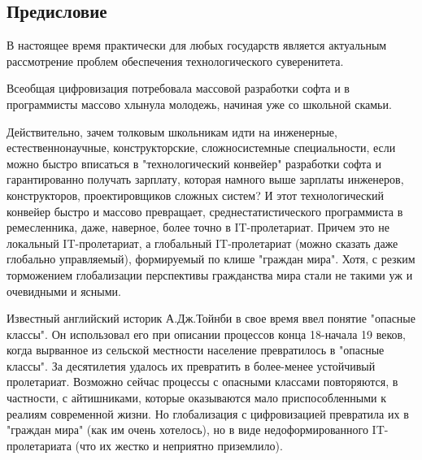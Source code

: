 \begin{partbacktext}
\part*{Предисловие}
\label{part_preface}

В настоящее время практически для любых государств является актуальным рассмотрение проблем обеспечения технологического суверенитета.

Всеобщая цифровизация потребовала массовой разработки софта и в программисты массово хлынула молодежь, начиная уже со школьной скамьи.

Действительно, зачем толковым школьникам идти на инженерные, естественнонаучные, конструкторские, сложносистемные специальности, если можно быстро вписаться в "технологический конвейер"{} разработки софта и гарантированно получать зарплату, которая намного выше зарплаты инженеров, конструкторов, проектировщиков сложных систем? И этот технологический конвейер быстро и массово превращает, среднестатистического программиста в ремесленника, даже, наверное, более точно в IT-пролетариат. Причем это не локальный IT-пролетариат, а глобальный IT-пролетариат (можно сказать даже глобально управляемый), формируемый по клише "граждан мира"{}. Хотя, с резким торможением глобализации перспективы гражданства мира стали не такими уж и очевидными и ясными.

Известный английский историк А.Дж.Тойнби в свое время ввел понятие "опасные классы"{}. Он использовал его при описании процессов конца 18-начала 19 веков, когда вырванное из сельской местности население превратилось в "опасные классы"{}. За десятилетия удалось их превратить в более-менее устойчивый пролетариат. Возможно сейчас процессы с опасными классами повторяются, в частности, с айтишниками, которые оказываются мало приспособленными к реалиям современной жизни. Но глобализация с цифровизацией превратила их в "граждан мира"{} (как им очень хотелось), но в виде недоформированного IT-пролетариата (что их жестко и неприятно приземлило).


\end{partbacktext}
